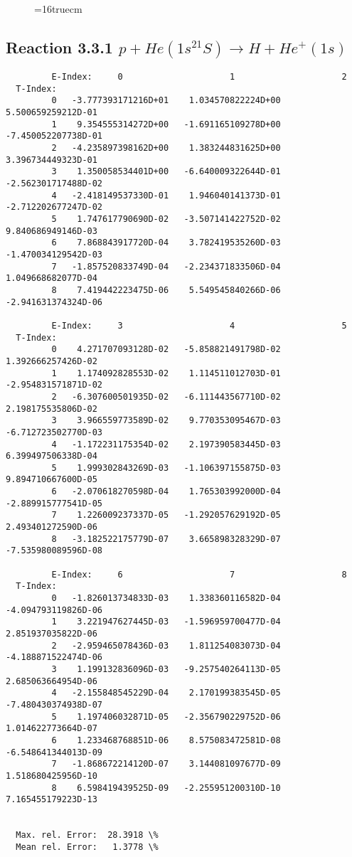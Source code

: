 \documentclass[12pt,dvipdfmx]{article}
\begin{document}
\begin{figure} \label{3.2.3b}
\epsfxsize=16truecm
\end{figure}
\newpage


\subsection{
Reaction 3.3.1  $  p + He(1s^21S) \rightarrow H + He^+(1s)  $
}


\begin{small}\begin{verbatim}
         E-Index:     0                     1                     2
  T-Index:
         0   -3.777393171216D+01    1.034570822224D+00    5.500659259212D-01
         1    9.354555314272D+00   -1.691165109278D+00   -7.450052207738D-01
         2   -4.235897398162D+00    1.383244831625D+00    3.396734449323D-01
         3    1.350058534401D+00   -6.640009322644D-01   -2.562301717488D-02
         4   -2.418149537330D-01    1.946040141373D-01   -2.712202677247D-02
         5    1.747617790690D-02   -3.507141422752D-02    9.840686949146D-03
         6    7.868843917720D-04    3.782419535260D-03   -1.470034129542D-03
         7   -1.857520833749D-04   -2.234371833506D-04    1.049668682077D-04
         8    7.419442223475D-06    5.549545840266D-06   -2.941631374324D-06

         E-Index:     3                     4                     5
  T-Index:
         0    4.271707093128D-02   -5.858821491798D-02    1.392666257426D-02
         1    1.174092828553D-02    1.114511012703D-01   -2.954831571871D-02
         2   -6.307600501935D-02   -6.111443567710D-02    2.198175535806D-02
         3    3.966559773589D-02    9.770353095467D-03   -6.712723502770D-03
         4   -1.172231175354D-02    2.197390583445D-03    6.399497506338D-04
         5    1.999302843269D-03   -1.106397155875D-03    9.894710667600D-05
         6   -2.070618270598D-04    1.765303992000D-04   -2.889915777541D-05
         7    1.226009237337D-05   -1.292057629192D-05    2.493401272590D-06
         8   -3.182522175779D-07    3.665898328329D-07   -7.535980089596D-08

         E-Index:     6                     7                     8
  T-Index:
         0   -1.826013734833D-03    1.338360116582D-04   -4.094793119826D-06
         1    3.221947627445D-03   -1.596959700477D-04    2.851937035822D-06
         2   -2.959465078436D-03    1.811254083073D-04   -4.188871522474D-06
         3    1.199132836096D-03   -9.257540264113D-05    2.685063664954D-06
         4   -2.155848545229D-04    2.170199383545D-05   -7.480430374938D-07
         5    1.197406032871D-05   -2.356790229752D-06    1.014622773664D-07
         6    1.233468768851D-06    8.575083472581D-08   -6.548641344013D-09
         7   -1.868672214120D-07    3.144081097677D-09    1.518680425956D-10
         8    6.598419439525D-09   -2.255951200310D-10    7.165455179223D-13


  Max. rel. Error:  28.3918 \%
  Mean rel. Error:   1.3778 \%
\end{verbatim}\end{small}
\end{document}
